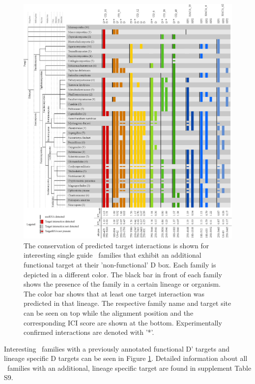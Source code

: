 \begin{figure}
  \centering
  \includegraphics[width=\textwidth]{pics/conservation_lineage_specific_targets.eps}
  \caption{The conservation of predicted target interactions is shown
    for interesting single guide \cd\ families that exhibit an
    additional functional target at their 'non-functional' D box. Each
    family is depicted in a different color. The black bar in front of
    each family shows the presence of the family in a certain lineage
    or organism. The color bar shows that at least one target
    interaction was predicted in that lineage. The respective family
    name and target site can be seen on top while the alignment
    position and the corresponding ICI score are shown at the
    bottom. Experimentally confirmed interactions are denoted with
    '*'.}
  \label{fig:additional_targets}
\end{figure}

Interesting \cd\ families with a previously annotated functional D'
targets and lineage specific D targets can be seen in Figure
\ref{fig:additional_targets}. Detailed information about all \sno\
families with an additional, lineage specific target are found in
supplement Table S9.

